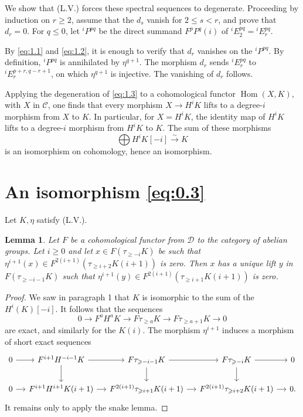\documentclass[11pt,a4paper]{article}
\theoremstyle{plain}
\newtheorem{lemma}[theorem]{Lemma}
\theoremstyle{definition}
\theoremstyle{remark}
\DeclareMathOperator{\Hom}{Hom}
\newcommand{\cD}{\mathscr{D}}
\newcommand{\cC}{\mathscr{C}}
\begin{document}
We show that (L.V.) forces these spectral sequences to degenerate. Proceeding by induction on $r\geqslant2$, assume that the $d_s$ vanish for $2\leqslant s<r$, and prove that $d_r=0$. For $q\leqslant0$, let ${}^i\!P^{pq}$ be the direct summand $F^pP^q(i)$ of ${}^i\!E_2^{pq}={}^i\!E_r^{pq}$.

By \eqref{eq:1.1} and \eqref{eq:1.2}, it is enough to verify that $d_r$ vanishes on the ${}^i\!P^{pq}$. By definition, ${}^i\!P^{pq}$ is annihilated by $\eta^{q+1}$. The morphism $d_r$ sends ${}^i\!E_r^{pq}$ to ${}^i\!E_r^{p+r,q-r+1}$, on which $\eta^{q+1}$ is injective. The vanishing of $d_r$ follows.

Applying the degeneration of \eqref{eq:1.3} to a cohomological functor $\Hom(X,K)$, with $X$ in $\cC$, one finds that every morphism $X\to H^iK$ lifts to a degree-$i$ morphism from $X$ to $K$. In particular, for $X=H^iK$, the identity map of $H^iK$ lifts to a degree-$i$ morphism from $H^iK$ to $K$. The sum of these morphisms
\[
\bigoplus H^iK[-i]\xrightarrow{\sim}K
\]
is an isomorphism on cohomology, hence an isomorphism.

\section{An isomorphism \eqref{eq:0.3}}

Let $K,\eta$ satisfy (L.V.).

\begin{lemma}\label{lem:2.1}
Let $F$ be a cohomological functor from $\cD$ to the category of abelian groups. Let $i\geqslant0$ and let $x\in F(\tau_{\geqslant -i}K)$ be such that $\eta^{i+1}(x)\in F^{2(i+1)}(\tau_{\geqslant i+2}K(i+1))$ is zero. Then $x$ has a unique lift $y$ in $F(\tau_{\geqslant -i-1}K)$ such that $\eta^{i+1}(y)\in F^{2(i+1)}(\tau_{\geqslant i+1}K(i+1))$ is zero.
\end{lemma}

\begin{proof}
We saw in paragraph 1 that $K$ is isomorphic to the sum of the $H^i(K)[-i]$. It follows that the sequences
\[
0\to F^aH^aK\to F\tau_{\geqslant a}K\to F\tau_{\geqslant a+1}K\to0
\]
are exact, and similarly for the $K(i)$. The morphism $\eta^{i+1}$ induces a morphism of short exact sequences
\[
\begin{tikzcd}[column sep=small]
0 \arrow[r] & F^{i+1}H^{-i-1}K \arrow[r] \arrow[d] & F\tau_{\geqslant -i-1}K \arrow[r] \arrow[d] & F\tau_{\geqslant -i}K \arrow[r] \arrow[d] & 0 \\
0 \arrow[r] & F^{i+1}H^{i+1}K(i+1) \arrow[r] & F^{2(i+1)}\tau_{\geqslant i+1}K(i+1) \arrow[r] & F^{2(i+1)}\tau_{\geqslant i+2}K(i+1) \arrow[r] & 0.
\end{tikzcd}
\]
It remains only to apply the snake lemma.
\end{proof}
\end{document}
